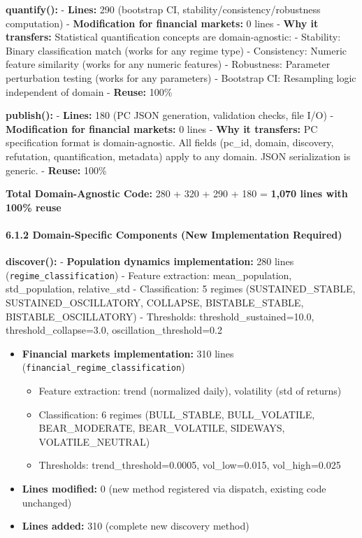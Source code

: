 \documentclass[
]{article}
\providecommand{\tightlist}{%
  \setlength{\itemsep}{0pt}\setlength{\parskip}{0pt}}
\begin{document}
\textbf{quantify():} - \textbf{Lines:} 290 (bootstrap CI,
stability/consistency/robustness computation) - \textbf{Modification for
financial markets:} 0 lines - \textbf{Why it transfers:} Statistical
quantification concepts are domain-agnostic: - Stability: Binary
classification match (works for any regime type) - Consistency: Numeric
feature similarity (works for any numeric features) - Robustness:
Parameter perturbation testing (works for any parameters) - Bootstrap
CI: Resampling logic independent of domain - \textbf{Reuse:} 100\%

\textbf{publish():} - \textbf{Lines:} 180 (PC JSON generation,
validation checks, file I/O) - \textbf{Modification for financial
markets:} 0 lines - \textbf{Why it transfers:} PC specification format
is domain-agnostic. All fields (pc\_id, domain, discovery, refutation,
quantification, metadata) apply to any domain. JSON serialization is
generic. - \textbf{Reuse:} 100\%

\textbf{Total Domain-Agnostic Code:} 280 + 320 + 290 + 180 =
\textbf{1,070 lines with 100\% reuse}

\paragraph{6.1.2 Domain-Specific Components (New Implementation
Required)}\label{domain-specific-components-new-implementation-required}

\textbf{discover():} - \textbf{Population dynamics implementation:} 280
lines (\texttt{regime\_classification}) - Feature extraction:
mean\_population, std\_population, relative\_std - Classification: 5
regimes (SUSTAINED\_STABLE, SUSTAINED\_OSCILLATORY, COLLAPSE,
BISTABLE\_STABLE, BISTABLE\_OSCILLATORY) - Thresholds:
threshold\_sustained=10.0, threshold\_collapse=3.0,
oscillation\_threshold=0.2

\begin{itemize}
\tightlist
\item
  \textbf{Financial markets implementation:} 310 lines
  (\texttt{financial\_regime\_classification})

  \begin{itemize}
  \tightlist
  \item
    Feature extraction: trend (normalized daily), volatility (std of
    returns)
  \item
    Classification: 6 regimes (BULL\_STABLE, BULL\_VOLATILE,
    BEAR\_MODERATE, BEAR\_VOLATILE, SIDEWAYS, VOLATILE\_NEUTRAL)
  \item
    Thresholds: trend\_threshold=0.0005, vol\_low=0.015, vol\_high=0.025
  \end{itemize}
\item
  \textbf{Lines modified:} 0 (new method registered via dispatch,
  existing code unchanged)
\item
  \textbf{Lines added:} 310 (complete new discovery method)
\end{itemize}
\end{document}
